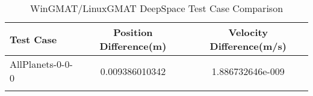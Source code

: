 \begin{table}[htbp!]
\centering
\caption{ WinGMAT/LinuxGMAT DeepSpace Test Case Comparison}
      \begin{tabular}{lcc}
      \hline\hline
          Test Case & Position Difference(m) & Velocity Difference(m/s) \\
         \hline
         AllPlanets-0-0-0 & 0.009386010342 & 1.886732646e-009 \\
      \hline\hline
      \label{Table: DeepSpace WinGMAT-LinuxGMAT Table} 
\end{tabular}
\end{table}
